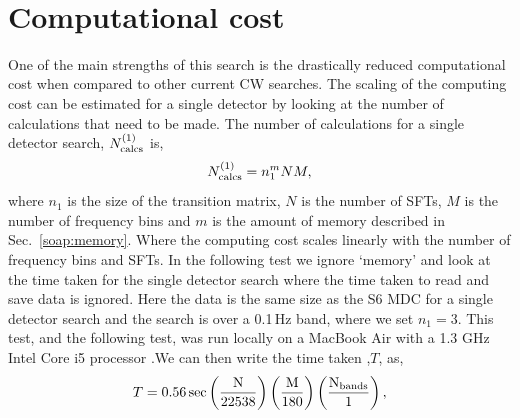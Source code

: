 ~

\clearpage

\section{\label{soap:results:time}Computational cost}

One of the main strengths of this search is the drastically reduced computational cost when compared to other current \gls{CW} searches.
The scaling of the computing cost can be estimated for a single detector by looking at the number of calculations that need to be made. 
The number of calculations for a single detector search, $N^{(1)}_{\rm{calcs}}$ is,
\begin{equation}
\label{soap:results:time:singlecalc}
N^{(1)}_{\rm{calcs}} = n_{1}^{m}NM,
\end{equation}
where $n_1$ is the size of the transition matrix, $N$ is the number of \glspl{SFT}, $M$ is the number of frequency bins and $m$ is the amount of memory described in Sec.~\ref{soap:memory}. Where the computing cost scales linearly with the number of frequency bins and \glspl{SFT}.
In the following test we ignore `memory' and look at the time taken for the single detector search where the time taken to read and save data is ignored. Here the data is the same size as the S6 \gls{MDC} for a single detector search and the search is over a 0.1\,Hz band, where we set $n_1=3$. This test, and the following test, was run locally on a MacBook Air with a 1.3 GHz Intel Core i5 processor .We can then write the time taken ,$T$, as,
%
\begin{equation}
T = 0.56\,\rm{sec}\left( \frac{N}{22538}\right) \left( \frac{M}{180}\right) \left( \frac{N_{\rm{bands}}}{1}\right),
\end{equation}

